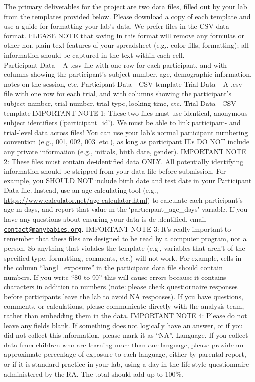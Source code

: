 \documentclass[
]{book}
\begin{document}
The primary deliverables for the project are two data files, filled out by your lab from the templates provided below. Please download a copy of each template and use a guide for formatting your lab's data. We prefer files in the CSV data format. PLEASE NOTE that saving in this format will remove any formulas or other non-plain-text features of your spreadsheet (e.g,. color fills, formatting); all information should be captured in the text within each cell.\\
Participant Data -- A .csv file with one row for each participant, and with columns showing the participant's subject number, age, demographic information, notes on the session, etc.
Participant Data - CSV template
Trial Data -- A .csv file with one row for each trial, and with columns showing the participant's subject number, trial number, trial type, looking time, etc.
Trial Data - CSV template
IMPORTANT NOTE 1: These two files must use identical, anonymous subject identifiers (`participant\_id'). We must be able to link participant- and trial-level data across files! You can use your lab's normal participant numbering convention (e.g., 001, 002, 003, etc.), as long as participant IDs DO NOT include any private information (e.g., initials, birth date, gender).
IMPORTANT NOTE 2: These files must contain de-identified data ONLY. All potentially identifying information should be stripped from your data file before submission. For example, you SHOULD NOT include birth date and test date in your Participant Data file. Instead, use an age calculating tool (e.g., \url{https://www.calculator.net/age-calculator.html}) to calculate each participant's age in days, and report that value in the `participant\_age\_days' variable. If you have any questions about ensuring your data is de-identified, email \href{mailto:contact@manybabies.org}{\nolinkurl{contact@manybabies.org}}.
IMPORTANT NOTE 3: It's really important to remember that these files are designed to be read by a computer program, not a person. So anything that violates the template (e.g., variables that aren't of the specified type, formatting, comments, etc.) will not work. For example, cells in the column ``lang1\_exposure'' in the participant data file should contain numbers. If you write ``80 to 90'' this will cause errors because it contains characters in addition to numbers (note: please check questionnaire responses before participants leave the lab to avoid NA responses). If you have questions, comments, or calculations, please communicate directly with the analysis team, rather than embedding them in the data.
IMPORTANT NOTE 4: Please do not leave any fields blank. If something does not logically have an answer, or if you did not collect this information, please mark it as ``NA''.
Language. If you collect data from children who are learning more than one language, please provide an approximate percentage of exposure to each language, either by parental report, or if it is standard practice in your lab, using a day-in-the-life style questionnaire administered by the RA. The total should add up to 100\%.
\end{document}
